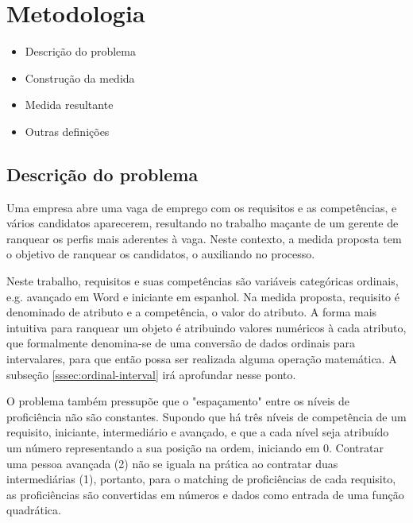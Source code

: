 \documentclass[preprint,12pt]{elsarticle}
\begin{document}
\section{Metodologia}
\label{sec:sample3}
\begin{itemize}
\color{blue}
\item Descrição do problema 
\item Construção da medida
\item Medida resultante
\item Outras definições
\end{itemize}

\subsection{Descrição do problema}

Uma empresa abre uma vaga de emprego com os requisitos e as competências, e vários candidatos aparecerem, resultando no trabalho maçante de um gerente de ranquear os perfis mais aderentes à vaga. Neste contexto, a medida proposta tem o objetivo de ranquear os candidatos, o auxiliando no processo.


Neste trabalho, requisitos e suas competências são variáveis categóricas ordinais, e.g. avançado em Word e iniciante em espanhol. Na medida proposta, requisito é denominado de atributo e a competência, o valor do atributo. A forma mais intuitiva para ranquear um objeto é atribuindo valores numéricos à cada atributo, que formalmente denomina-se de uma conversão de dados ordinais para intervalares, para que então possa ser realizada alguma operação matemática. A subseção \ref{sssec:ordinal-interval} irá aprofundar nesse ponto.

O problema também pressupõe que o "espaçamento" entre os níveis de proficiência não são constantes. Supondo que há três níveis de competência de um requisito, iniciante, intermediário e avançado, e que a cada nível seja atribuído um número representando a sua posição na ordem, iniciando em 0. Contratar uma pessoa avançada (2) não se iguala na prática ao contratar duas intermediárias (1), portanto, para o matching de proficiências de cada requisito, as proficiências são convertidas em números e dados como entrada de uma função quadrática. 
\end{document}
